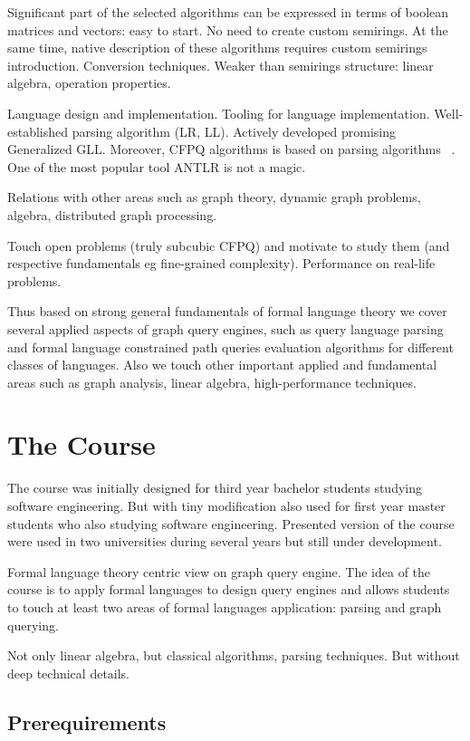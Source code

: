 \documentclass[sigconf]{acmart}
\begin{document}
Significant part of the selected algorithms can be expressed in terms of boolean matrices and vectors: easy to start.
No need to create custom semirings.
At the same time, native description of these algorithms requires custom semirings introduction.
Conversion techniques.
Weaker than semirings structure: linear algebra, operation properties. 

Language design and implementation. 
Tooling for language implementation.
Well-established parsing algorithm (LR, LL).
Actively developed promising Generalized GLL. 
Moreover, CFPQ algorithms is based on parsing algorithms ~\cite{!!!,!!!,!!!}.
One of the most popular tool ANTLR is not a magic. 

Relations with other areas such as graph theory, dynamic graph problems, algebra, distributed graph processing.

Touch open problems (truly subcubic CFPQ) and motivate to study them (and respective fundamentals eg fine-grained complexity).
Performance on real-life problems.

Thus based on strong general fundamentals of formal language theory we cover several applied aspects of graph query engines, such as query language parsing and formal language constrained path queries evaluation algorithms for different classes of languages.
Also we touch other important applied and fundamental areas such as graph analysis, linear algebra, high-performance techniques.

\section{The Course}

The course was initially designed for third year bachelor students studying software engineering.
But with tiny modification also used for first year master students who also studying software engineering.
Presented version of the course were used in two universities during several years but still under development.


Formal language theory centric view on graph query engine.
The idea of the course is to apply formal languages to design query engines and allows students to touch at least two areas of formal languages application: parsing and graph querying.

Not only linear algebra, but classical algorithms, parsing techniques.
But without deep technical details.

\subsection{Prerequirements}
\end{document}
